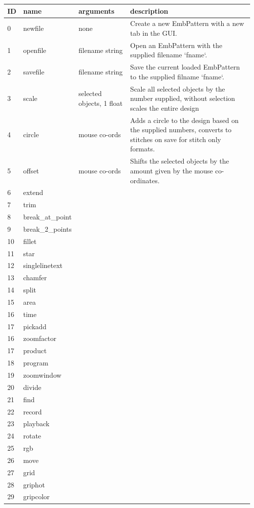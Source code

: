 \documentclass{report}
\begin{document}
\begin{tabular}{l l l l}
\textbf{ID} & \textbf{name} & \textbf{arguments} & \textbf{description} \\
\hline
0 & newfile & none & Create a new EmbPattern with a new tab in the GUI. \\
1 & openfile & filename string & Open an EmbPattern with the supplied filename `fname`.  \\
2 & savefile & filename string & Save the current loaded EmbPattern to the supplied filname `fname`. \\
3 & scale & selected objects, 1 float & Scale all selected objects by the number supplied, without selection scales the entire design \\
4 & circle & mouse co-ords & Adds a circle to the design based on the supplied numbers, converts to stitches on save for stitch only formats. \\
5 & offset & mouse co-ords & Shifts the selected objects by the amount given by the mouse co-ordinates.  \\
6 & extend & & \\
7 & trim & & \\
8 & break\_at\_point & & \\
9 & break\_2\_points & & \\
10 & fillet & & \\
11 & star & & \\
12 & singlelinetext & & \\
13 & chamfer & & \\
14 & split & & \\
15 & area & & \\
16 & time & & \\
17 & pickadd & & \\
16 & zoomfactor & & \\
17 & product & & \\
18 & program & & \\
19 & zoomwindow & & \\
20 & divide & & \\
21 & find & & \\
22 & record & & \\
23 & playback & & \\
24 & rotate & & \\
25 & rgb & & \\
26 & move & & \\
27 & grid & & \\
28 & griphot &  &  \\
29 & gripcolor & & \\

\end{tabular}
\end{document}
